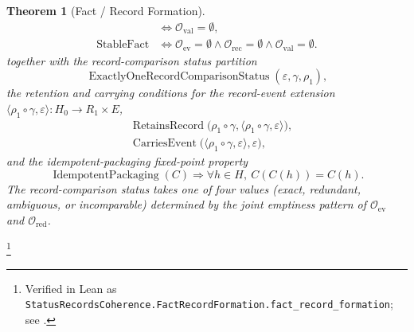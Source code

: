 \documentclass[11pt]{article}
\newtheorem{theorem}{Theorem}[section]
\theoremstyle{definition}
\begin{document}
\begin{theorem}[Fact / Record Formation]
\begin{align*}
  &\iff \mathcal O_{\mathrm{val}}=\emptyset,\\
  \operatorname{StableFact}
  &\iff
  \mathcal O_{\mathrm{ev}}=\emptyset
  \wedge
  \mathcal O_{\mathrm{rec}}=\emptyset
  \wedge
  \mathcal O_{\mathrm{val}}=\emptyset.
\end{align*}
together with the record-comparison status partition
\[
  \operatorname{ExactlyOneRecordComparisonStatus}
    (\varepsilon,\gamma,\rho_1),
\]
the retention and carrying conditions for the record-event extension
\(\langle\rho_1\circ\gamma,\varepsilon\rangle:H_0\to R_1\times E\),
\begin{align*}
  &\operatorname{RetainsRecord}
      \bigl(\rho_1\circ\gamma,
        \langle\rho_1\circ\gamma,\varepsilon\rangle\bigr),\\
  &\operatorname{CarriesEvent}
      \bigl(\langle\rho_1\circ\gamma,\varepsilon\rangle,
        \varepsilon\bigr),
\end{align*}
and the idempotent-packaging fixed-point property
\[
  \operatorname{IdempotentPackaging}(C)
  \Longrightarrow
  \forall h\in H,\ C(C(h))=C(h).
\]
The record-comparison status takes one of four values
(\emph{exact}, \emph{redundant}, \emph{ambiguous}, or
\emph{incomparable}) determined by the joint emptiness pattern of
\(\mathcal O_{\mathrm{ev}}\) and \(\mathcal O_{\mathrm{red}}\).
\end{theorem}
\footnote{\raggedright Verified in Lean as
\texttt{StatusRecordsCoherence.FactRecordFormation.\allowbreak{}fact\_record\_formation};
see .}
\end{document}
